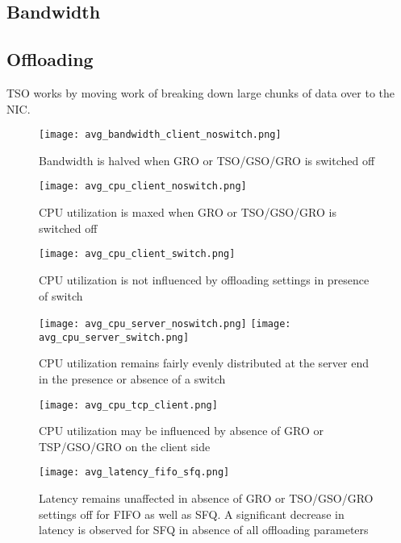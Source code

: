 \subsection{Bandwidth}
\subsection{Offloading}
TSO works by moving work of breaking down large chunks of data over to the NIC.
\begin{figure}[t] 
\texttt{[image: avg\_bandwidth\_client\_noswitch.png]}
\caption{Bandwidth is halved when GRO or TSO/GSO/GRO is switched off} 
\label{fig:avg_bandwidth_client_noswitch}
\end{figure}

\begin{figure}[t] 
\texttt{[image: avg\_cpu\_client\_noswitch.png]}
\caption{CPU utilization is maxed when GRO or TSO/GSO/GRO is switched off} 
\label{fig:avg_cpu_client_noswitch}
\end{figure}


\begin{figure}[t] 
\texttt{[image: avg\_cpu\_client\_switch.png]}
\caption{CPU utilization is not influenced by offloading settings 
in presence of switch} 
\label{fig:avg_cpu_client_switch}
\end{figure}


\begin{figure}[t] 
\texttt{[image: avg\_cpu\_server\_noswitch.png]}
\texttt{[image: avg\_cpu\_server\_switch.png]}
\caption{CPU utilization remains fairly evenly distributed at the server end
in the presence or absence of a switch} 
\label{fig:avg_cpu_server_noswitch}
\end{figure}

\begin{figure}[t] 
\texttt{[image: avg\_cpu\_tcp\_client.png]}
\caption{CPU utilization may be influenced by absence of GRO or TSP/GSO/GRO on
the client side} 
\label{fig:avg_cpu_tcp_client}
\end{figure}

\begin{figure}[t] 
\texttt{[image: avg\_latency\_fifo\_sfq.png]}
\caption{Latency remains unaffected in absence of GRO or TSO/GSO/GRO settings
off for FIFO as well as SFQ. A significant decrease in latency is observed for
SFQ in absence of all offloading parameters} 
\label{fig:avg_latency_fifo_sfq}
\end{figure}


